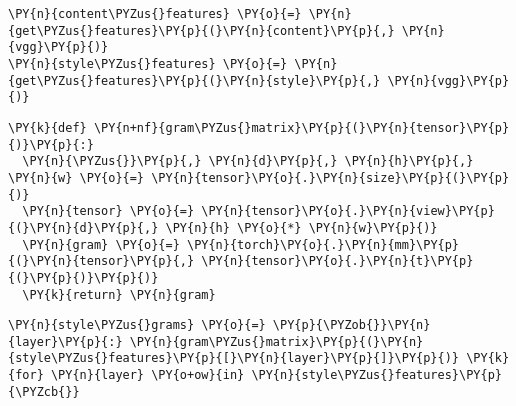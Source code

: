     \begin{tcolorbox}[breakable, size=fbox, boxrule=1pt, pad at break*=1mm,colback=cellbackground, colframe=cellborder]
\begin{Verbatim}[commandchars=\\\{\}]
\PY{n}{content\PYZus{}features} \PY{o}{=} \PY{n}{get\PYZus{}features}\PY{p}{(}\PY{n}{content}\PY{p}{,} \PY{n}{vgg}\PY{p}{)}
\PY{n}{style\PYZus{}features} \PY{o}{=} \PY{n}{get\PYZus{}features}\PY{p}{(}\PY{n}{style}\PY{p}{,} \PY{n}{vgg}\PY{p}{)}
\end{Verbatim}
\end{tcolorbox}

    \begin{tcolorbox}[breakable, size=fbox, boxrule=1pt, pad at break*=1mm,colback=cellbackground, colframe=cellborder]
\begin{Verbatim}[commandchars=\\\{\}]
\PY{k}{def} \PY{n+nf}{gram\PYZus{}matrix}\PY{p}{(}\PY{n}{tensor}\PY{p}{)}\PY{p}{:}
  \PY{n}{\PYZus{}}\PY{p}{,} \PY{n}{d}\PY{p}{,} \PY{n}{h}\PY{p}{,} \PY{n}{w} \PY{o}{=} \PY{n}{tensor}\PY{o}{.}\PY{n}{size}\PY{p}{(}\PY{p}{)}
  \PY{n}{tensor} \PY{o}{=} \PY{n}{tensor}\PY{o}{.}\PY{n}{view}\PY{p}{(}\PY{n}{d}\PY{p}{,} \PY{n}{h} \PY{o}{*} \PY{n}{w}\PY{p}{)}
  \PY{n}{gram} \PY{o}{=} \PY{n}{torch}\PY{o}{.}\PY{n}{mm}\PY{p}{(}\PY{n}{tensor}\PY{p}{,} \PY{n}{tensor}\PY{o}{.}\PY{n}{t}\PY{p}{(}\PY{p}{)}\PY{p}{)}
  \PY{k}{return} \PY{n}{gram}
\end{Verbatim}
\end{tcolorbox}

    \begin{tcolorbox}[breakable, size=fbox, boxrule=1pt, pad at break*=1mm,colback=cellbackground, colframe=cellborder]
\begin{Verbatim}[commandchars=\\\{\}]
\PY{n}{style\PYZus{}grams} \PY{o}{=} \PY{p}{\PYZob{}}\PY{n}{layer}\PY{p}{:} \PY{n}{gram\PYZus{}matrix}\PY{p}{(}\PY{n}{style\PYZus{}features}\PY{p}{[}\PY{n}{layer}\PY{p}{]}\PY{p}{)} \PY{k}{for} \PY{n}{layer} \PY{o+ow}{in} \PY{n}{style\PYZus{}features}\PY{p}{\PYZcb{}}
\end{Verbatim}
\end{tcolorbox}

